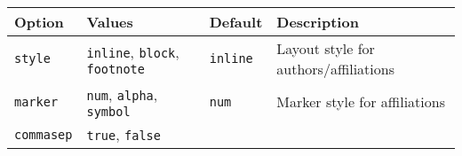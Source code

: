 \documentclass[
]{article}
\begin{document}
\begin{longtable}[]{@{}llll@{}}
\toprule
\begin{minipage}[b]{0.19\columnwidth}\raggedright
Option\strut
\end{minipage} & \begin{minipage}[b]{0.19\columnwidth}\raggedright
Values\strut
\end{minipage} & \begin{minipage}[b]{0.21\columnwidth}\raggedright
Default\strut
\end{minipage} & \begin{minipage}[b]{0.30\columnwidth}\raggedright
Description\strut
\end{minipage}\tabularnewline
\midrule
\endhead
\begin{minipage}[t]{0.19\columnwidth}\raggedright
\texttt{style}\strut
\end{minipage} & \begin{minipage}[t]{0.19\columnwidth}\raggedright
\texttt{inline}, \texttt{block}, \texttt{footnote}\strut
\end{minipage} & \begin{minipage}[t]{0.21\columnwidth}\raggedright
\texttt{inline}\strut
\end{minipage} & \begin{minipage}[t]{0.30\columnwidth}\raggedright
Layout style for authors/affiliations\strut
\end{minipage}\tabularnewline
\begin{minipage}[t]{0.19\columnwidth}\raggedright
\texttt{marker}\strut
\end{minipage} & \begin{minipage}[t]{0.19\columnwidth}\raggedright
\texttt{num}, \texttt{alpha}, \texttt{symbol}\strut
\end{minipage} & \begin{minipage}[t]{0.21\columnwidth}\raggedright
\texttt{num}\strut
\end{minipage} & \begin{minipage}[t]{0.30\columnwidth}\raggedright
Marker style for affiliations\strut
\end{minipage}\tabularnewline
\begin{minipage}[t]{0.19\columnwidth}\raggedright
\texttt{commasep}\strut
\end{minipage} & \begin{minipage}[t]{0.19\columnwidth}\raggedright
\texttt{true}, \texttt{false}\strut
\end{minipage} & \begin{minipage}[t]{0.21\columnwidth}\raggedright

\end{minipage}
\end{longtable}
\end{document}
